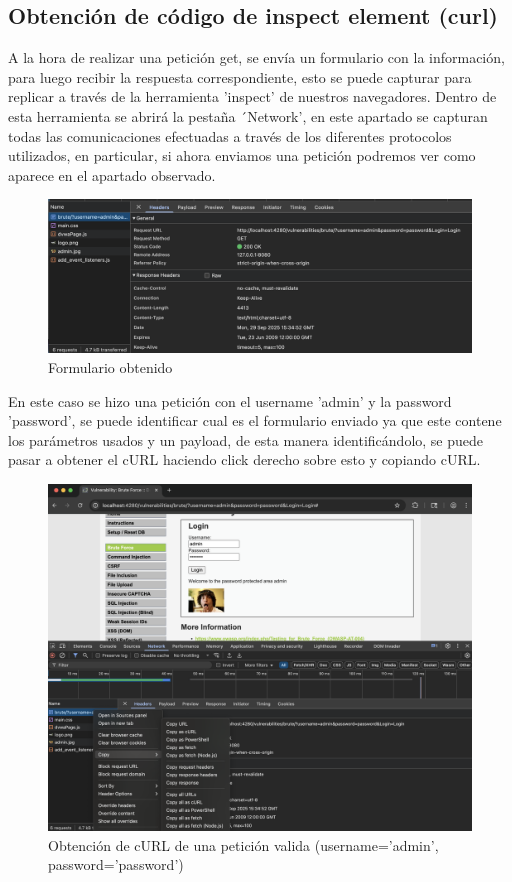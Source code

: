 \documentclass[letter,12pt]{article}
\begin{document}
\subsection{Obtención de código de inspect element (curl)}

A la hora de realizar una petición get, se envía un formulario con la información, para luego recibir la respuesta correspondiente, esto se puede capturar para replicar a través de la herramienta 'inspect' de nuestros navegadores.
Dentro de esta herramienta se abrirá la pestaña ´Network', en este apartado se capturan todas las comunicaciones efectuadas a través de los diferentes protocolos utilizados, en particular, si ahora enviamos una petición podremos ver como aparece en el apartado observado.
\begin{figure}[H]
    \centering
    \includegraphics[width=1\linewidth]{Imagenes/cURL_how_to_obtain.png}
    \caption{Formulario obtenido}
    \label{fig:placeholder}
\end{figure}
En este caso se hizo una petición con el username 'admin' y la password 'password', se puede identificar cual es el formulario enviado ya que este contene los parámetros usados y un payload, de esta manera identificándolo, se puede pasar a obtener el cURL haciendo click derecho sobre esto y copiando cURL.
\begin{figure}[H]
    \centering
    \includegraphics[width=0.65\linewidth]{Imagenes/cURL_obtain_valid.png}
    \caption{Obtención de cURL de una petición valida (username='admin', password='password')}
    \label{fig:placeholder}
\end{figure}
\end{document}
